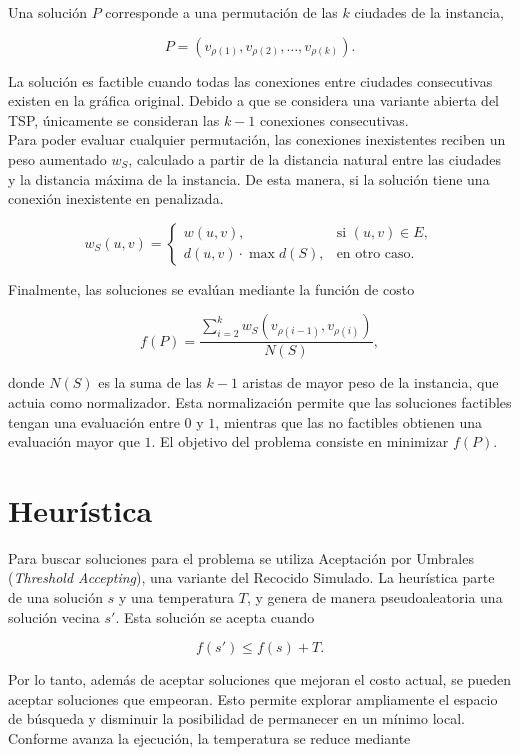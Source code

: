 \documentclass[twoside,11pt]{article}
\begin{document}
Una solución $P$ corresponde a una permutación de las $k$ ciudades de la
instancia,

\[
P=(v_{\rho(1)},v_{\rho(2)},\ldots,v_{\rho(k)}).
\]

La solución es factible cuando todas las conexiones entre ciudades consecutivas existen en la gráfica original. Debido a que se considera una variante abierta del TSP, únicamente se consideran las $k-1$ conexiones consecutivas.\\

Para poder evaluar cualquier permutación, las conexiones inexistentes reciben un peso aumentado $w_S$, calculado a partir de la distancia natural entre las ciudades y la distancia máxima de la instancia. De esta manera, si la solución tiene una conexión inexistente en penalizada.

\[
w_S(u,v)=
\begin{cases}
w(u,v), & \text{si } (u,v)\in E,\\[4pt]
d(u,v)\cdot \max d(S), & \text{en otro caso}.
\end{cases}
\]

\vspace{0.05cm}

Finalmente, las soluciones se evalúan mediante la función de costo 

\[
f(P)=
\frac{\displaystyle\sum_{i=2}^{k}
w_S(v_{\rho(i-1)},v_{\rho(i)})}
{N(S)},
\]

donde $N(S)$ es la suma de las $k-1$ aristas de mayor peso de la instancia, que actuia como normalizador.
Esta normalización permite que las soluciones factibles tengan una evaluación entre $0$ y $1$, mientras que las no factibles obtienen una evaluación mayor que $1$. El objetivo del problema consiste en minimizar $f(P)$.


\section{Heurística}

Para buscar soluciones para el problema se utiliza Aceptación por Umbrales (\textit{Threshold Accepting}), una variante del Recocido Simulado. La heurística parte de una solución $s$ y una temperatura $T$, y genera de manera pseudoaleatoria una solución vecina $s'$. Esta solución se acepta cuando

\[
f(s') \leq f(s)+T.
\]

Por lo tanto, además de aceptar soluciones que mejoran el costo actual, se pueden aceptar soluciones que empeoran. Esto permite explorar ampliamente el espacio de búsqueda y disminuir la posibilidad de permanecer en
un mínimo local. Conforme avanza la ejecución, la temperatura se reduce mediante
\end{document}
